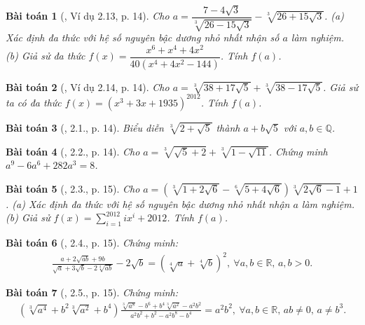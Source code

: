 \documentclass{article}
\newtheorem{baitoan}{Bài toán}
\begin{document}
\begin{baitoan}[\cite{TLCT_THCS_Toan_9_dai_so}, Ví dụ 2.13, p. 14]
	Cho $a = \dfrac{7- 4\sqrt{3}}{\sqrt[3]{26 - 15\sqrt{3}}} - \sqrt[3]{26 + 15\sqrt{3}}$. (a) Xác định đa thức với hệ số nguyên bậc dương nhỏ nhất nhận số $a$ làm nghiệm. (b) Giả sử đa thức $f(x) = \dfrac{x^6 + x^4 + 4x^2}{40(x^4 + 4x^2 - 144)}$. Tính $f(a)$.
\end{baitoan}

\begin{baitoan}[\cite{TLCT_THCS_Toan_9_dai_so}, Ví dụ 2.14, p. 14]
	Cho $a = \sqrt[3]{38 + 17\sqrt{5}} + \sqrt[3]{38 - 17\sqrt{5}}$. Giả sử ta có đa thức $f(x) = (x^3 + 3x + 1935)^{2012}$. Tính $f(a)$.
\end{baitoan}

\begin{baitoan}[\cite{TLCT_THCS_Toan_9_dai_so}, 2.1., p. 14]
	Biểu diễn $\sqrt[3]{2 + \sqrt{5}}$ thành $a + b\sqrt{5}$ với $a,b\in\mathbb{Q}$.
\end{baitoan}

\begin{baitoan}[\cite{TLCT_THCS_Toan_9_dai_so}, 2.2., p. 14]
	Cho $a = \sqrt[3]{\sqrt{5} + 2} + \sqrt[3]{1 - \sqrt{11}}$. Chứng minh $a^9 - 6a^6 + 282a^3 = 8$.
\end{baitoan}

\begin{baitoan}[\cite{TLCT_THCS_Toan_9_dai_so}, 2.3., p. 15]
	Cho $a = (\sqrt[3]{1 + 2\sqrt{6}} - \sqrt[6]{5 + 4\sqrt{6}})\sqrt[3]{2\sqrt{6} - 1} + 1$. (a) Xác định đa thức với hệ số nguyên bậc dương nhỏ nhất nhận $a$ làm nghiệm. (b) Giả sử $f(x) = \sum_{i=1}^{2012} ix^i + 2012$. Tính $f(a)$.
\end{baitoan}

\begin{baitoan}[\cite{TLCT_THCS_Toan_9_dai_so}, 2.4., p. 15]
	Chứng minh:
	\begin{align*}
		\frac{a + 2\sqrt{ab} + 9b}{\sqrt{a} + 3\sqrt{b} - 2\sqrt[4]{ab}} - 2\sqrt{b} = \left(\sqrt[4]{a} + \sqrt[4]{b}\right)^2,\ \forall a,b\in\mathbb{R},\,a,b > 0.
	\end{align*}
\end{baitoan}

\begin{baitoan}[\cite{TLCT_THCS_Toan_9_dai_so}, 2.5., p. 15]
	Chứng minh:
	\begin{align*}
		\left(\sqrt[3]{a^4} + b^2\sqrt[3]{a^2} + b^4\right)\frac{\sqrt[3]{a^8} - b^6 + b^4\sqrt[3]{a^2} - a^2b^2}{a^2b^2 + b^2 - a^2b^8 - b^4} = a^2b^2,\ \forall a,b\in\mathbb{R},\,ab\ne0,\,a\ne b^3.
	\end{align*}
\end{baitoan}
\end{document}
